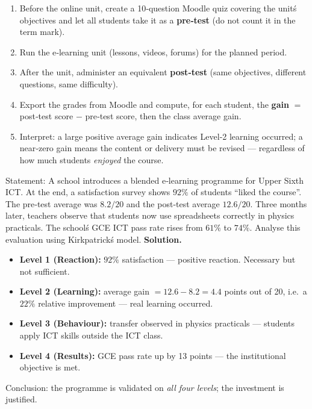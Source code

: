 \documentclass[11pt]{article}
\begin{document}
\begin{methode}
\begin{enumerate}
\item Before the online unit, create a 10‑question Moodle quiz covering the unit\'s objectives and let all students take it as a \textbf{pre‑test} (do not count it in the term mark).
\item Run the e‑learning unit (lessons, videos, forums) for the planned period.
\item After the unit, administer an equivalent \textbf{post‑test} (same objectives, different questions, same difficulty).
\item Export the grades from Moodle and compute, for each student, the \textbf{gain} $=$ post‑test score $-$ pre‑test score, then the class average gain.
\item Interpret: a large positive average gain indicates Level‑2 learning occurred; a near‑zero gain means the content or delivery must be revised — regardless of how much students \emph{enjoyed} the course.
\end{enumerate}
\end{methode}

\begin{exoresolu}
Statement: A school introduces a blended e‑learning programme for Upper Sixth ICT. At the end, a satisfaction survey shows $92\%$ of students ``liked the course''. The pre‑test average was $8.2/20$ and the post‑test average $12.6/20$. Three months later, teachers observe that students now use spreadsheets correctly in physics practicals. The school\'s GCE ICT pass rate rises from $61\%$ to $74\%$. Analyse this evaluation using Kirkpatrick\'s model.
\tcblower
\textbf{Solution.}
\begin{itemize}
\item \textbf{Level 1 (Reaction):} $92\%$ satisfaction — positive reaction. Necessary but not sufficient.
\item \textbf{Level 2 (Learning):} average gain $= 12.6 - 8.2 = 4.4$ points out of 20, i.e.\ a $22\%$ relative improvement — real learning occurred.
\item \textbf{Level 3 (Behaviour):} transfer observed in physics practicals — students apply ICT skills outside the ICT class.
\item \textbf{Level 4 (Results):} GCE pass rate up by 13 points — the institutional objective is met.
\end{itemize}
Conclusion: the programme is validated on \emph{all four levels}; the investment is justified.
\end{exoresolu}
\end{document}
